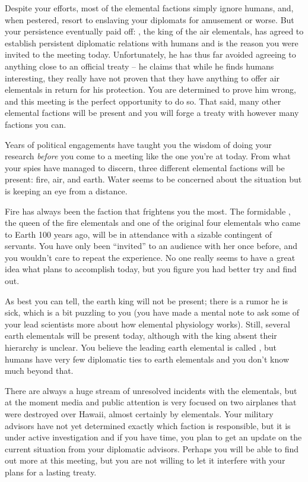 \documentclass[char]{elementals}
\begin{document}
Despite your efforts, most of the elemental factions simply ignore humans, and, when pestered, resort to enslaving your diplomats for amusement or worse. But your persistence eventually paid off: \cKing{\intro}, the king of the air elementals, has agreed to establish persistent diplomatic relations with humans and is the reason you were invited to the meeting today. Unfortunately, he has thus far avoided agreeing to anything close to an official treaty -- he claims that while he finds humans interesting, they really have not proven that they have anything to offer air elementals in return for his protection. You are determined to prove him wrong, and this meeting is the perfect opportunity to do so. That said, many other elemental factions will be present and you will forge a treaty with however many factions you can.

Years of political engagements have taught you the wisdom of doing your research \emph{before} you come to a meeting like the one you're at today. From what your spies have managed to discern, three different elemental factions will be present: fire, air, and earth. Water seems to be concerned about the situation but is keeping an eye from a distance.


Fire has always been the faction that frightens you the most. The formidable \cQueen{\intro}, the queen of the fire elementals and one of the original four elementals who came to Earth 100 years ago, will be in attendance with a sizable contingent of servants. You have only been ``invited'' to an audience with her once before, and you wouldn't care to repeat the experience. No one really seems to have a great idea what \cQueen{} plans to accomplish today, but you figure you had better try and find out.

As best you can tell, the earth king will not be present; there is a rumor he is sick, which is a bit puzzling to you (you have made a mental note to ask some of your lead scientists more about how elemental physiology works). Still, several earth elementals will be present today, although with the king absent their hierarchy is unclear. You believe the leading earth elemental is called \cLoyal{\intro}, but humans have very few diplomatic ties to earth elementals and you don't know much beyond that.

There are always a huge stream of unresolved incidents with the elementals, but at the moment media and public attention is very focused on two airplanes that were destroyed over Hawaii, almost certainly by elementals. Your military advisors have not yet determined exactly which faction is responsible, but it is under active investigation and if you have time, you plan to get an update on the current situation from your diplomatic advisors. Perhaps you will be able to find out more at this meeting, but you are not willing to let it interfere with your plans for a lasting treaty.
\end{document}
